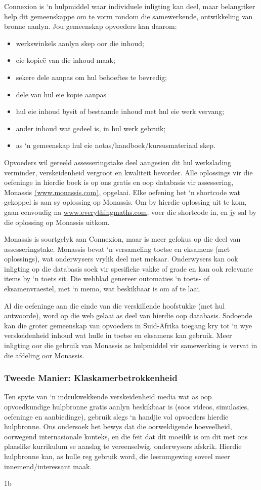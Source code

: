 Connexion is ‘n hulpmiddel waar individuele inligting kan deel, maar belangriker help dit gemeenskappe om te vorm rondom die samewerkende, ontwikkeling van bronne aanlyn. Jou gemeenskap opvoeders kan daarom:
\begin{itemize}[noitemsep]
\item werkswinkels aanlyn skep oor die inhoud;
\item eie kopieë van die inhoud maak;
\item sekere dele aanpas om hul behoeftes te bevredig;
\item dele van hul eie kopie aanpas
\item hul eie inhoud bysit of bestaande inhoud met hul eie werk vervang;
\item ander inhoud wat gedeel is, in hul werk gebruik;
\item as ‘n gemeenskap hul eie notas/handboek/kursusmateriaal skep.
\end{itemize}
Opvoeders wil gereeld assesseringstake deel aangesien dit hul werkslading verminder, verskeidenheid vergroot en kwaliteit bevorder. Alle oplossings vir die oefeninge in hierdie boek is op ons gratis en oop databasis vir assessering, Monassis \underline{(www.monassis.com)}, opgelaai. Elke oefening het ‘n shortcode wat gekoppel is aan sy oplossing op Monassis. Om by hierdie oplossing uit te kom, gaan eenvoudig na \underline{www.everythingmaths.com}, voer die shortcode in, en jy sal by die oplossing op Monassis uitkom.

Monassis is soortgelyk aan Connexion, maar is meer gefokus op die deel van assesseringstake. Monassis bevat ‘n versameling toetse en eksamens (met oplossings), wat onderwysers vrylik deel met mekaar. Onderwysers kan ook inligting op die databasis soek vir spesifieke vakke of grade en kan ook relevante items by ‘n toets sit. Die webblad genereer outomaties ‘n toets- of eksamenvraestel, met ‘n memo, wat beskikbaar is om af te laai. \par

Al die oefeninge aan die einde van die verskillende hoofstukke (met hul antwoorde), word op die web gelaai as deel van hierdie oop databasis. Sodoende kan die groter gemeenskap van opvoeders in Suid-Afrika toegang kry tot ‘n wye verskeidenheid inhoud wat hulle in toetse en eksamens kan gebruik. Meer inligting oor die gebruik van Monassis as hulpmiddel vir samewerking is vervat in die afdeling oor Monassis.\par

\subsubsection{Tweede Manier: Klaskamerbetrokkenheid}
Ten spyte van ‘n indrukwekkende verskeidenheid media wat as oop opvoedkundige hulpbronne gratis aanlyn beskikbaar is (soos videos, simulasies, oefeninge en aanbiedinge), gebruik slegs ‘n handjie vol opvoeders hierdie hulpbronne. Ons ondersoek het bewys dat die oorweldigende hoeveelheid, oorwegend internasionale konteks, en die feit dat dit moeilik is om dit met ons plaaslike kurrikulum se aanslag te vereenselwig, onderwysers afskrik. Hierdie hulpbronne kan, as hulle reg gebruik word, die leeromgewing soveel meer innemend/interessant maak.\par1b


